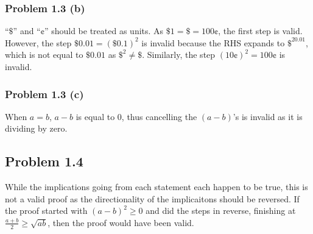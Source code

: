\documentclass{article}
\begin{document}
\subsubsection{Problem 1.3 (b)}
``$\$$'' and ``¢'' should be treated as units. As $\$1=\$=100\text{¢}$, the first step is valid. However, the step $\$0.01 = (\$0.1)^2$ is invalid because the RHS expands to $\$^20.01$, which is not equal to $\$0.01$ as $\$^2\ne\$$. Similarly, the step $(10\text{¢})^2 = 100\text{¢}$ is invalid.
\subsubsection{Problem 1.3 (c)}
When $a=b$, $a-b$ is equal to $0$, thus cancelling the $(a-b)$'s is invalid as it is dividing by zero.
\subsection{Problem 1.4}
While the implications going from each statement each happen to be true, this is not a valid proof as the directionality of the implicaitons should be reversed. If the proof started with $(a-b)^2 \ge 0$ and did the steps in reverse, finishing at $\frac{a+b}{2} \ge \sqrt{ab}$, then the proof would have been valid.
\end{document}
